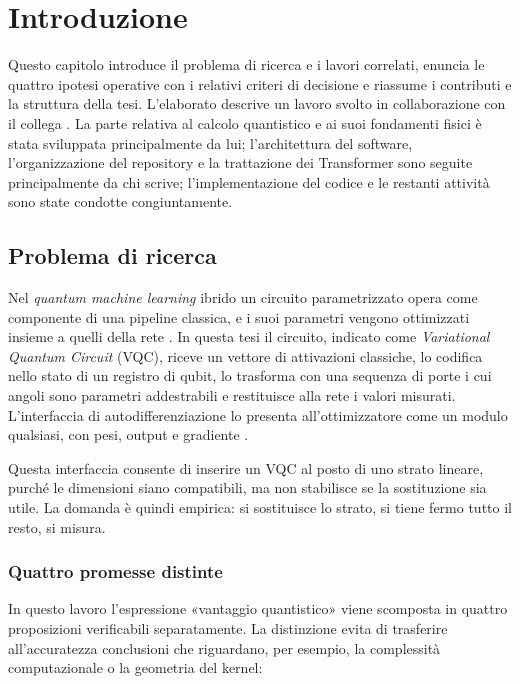 \chapter{Introduzione}
\label{cap:introduzione}

Questo capitolo introduce il problema di ricerca e i lavori correlati, enuncia le
quattro ipotesi operative con i relativi criteri di decisione e riassume i
contributi e la struttura della tesi. L'elaborato descrive un lavoro svolto in
collaborazione con il collega \Coautore{}. La parte relativa al calcolo
quantistico e ai suoi fondamenti fisici è stata sviluppata principalmente da lui;
l'architettura del software, l'organizzazione del repository e la trattazione dei
Transformer sono seguite principalmente da chi scrive; l'implementazione del
codice e le restanti attività sono state condotte congiuntamente.

\section{Problema di ricerca}
\label{sec:problema}

Nel \emph{quantum machine learning} ibrido un circuito parametrizzato opera come
componente di una pipeline classica, e i suoi parametri vengono ottimizzati
insieme a quelli della rete \parencite{biamonte2017qml,cerezo2021variational}. In
questa tesi il circuito, indicato come \emph{Variational Quantum Circuit} (VQC),
riceve un vettore di attivazioni classiche, lo codifica nello stato di un registro
di qubit, lo trasforma con una sequenza di porte i cui angoli sono parametri
addestrabili e restituisce alla rete i valori misurati. L'interfaccia di
autodifferenziazione lo presenta all'ottimizzatore come un modulo qualsiasi, con
pesi, output e gradiente \parencite{bergholm2018pennylane}.

Questa interfaccia consente di inserire un VQC al posto di uno strato lineare,
purché le dimensioni siano compatibili, ma non stabilisce se la sostituzione sia
utile. La domanda è quindi empirica:
si sostituisce lo strato, si tiene fermo tutto il resto, si misura.

\subsection{Quattro promesse distinte}
\label{ssec:quattro-promesse}

In questo lavoro l'espressione «vantaggio quantistico» viene scomposta in quattro
proposizioni verificabili separatamente. La distinzione evita di trasferire
all'accuratezza conclusioni che riguardano, per esempio, la complessità
computazionale o la geometria del kernel:

